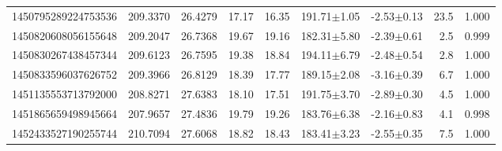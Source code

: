 \begin{table}[ht]
\begin{tabular}{rrrrrrrrc}
1450795289224753536 & 209.3370 & 26.4279 & 17.17 & 16.35 & 191.71$\pm$1.05 & -2.53$\pm$0.13 & 23.5 & 1.000 \\
1450820608056155648 & 209.2047 & 26.7368 & 19.67 & 19.16 & 182.31$\pm$5.80 & -2.39$\pm$0.61 & 2.5 & 0.999 \\
1450830267438457344 & 209.6123 & 26.7595 & 19.38 & 18.84 & 194.11$\pm$6.79 & -2.48$\pm$0.54 & 2.8 & 1.000 \\
1450833596037626752 & 209.3966 & 26.8129 & 18.39 & 17.77 & 189.15$\pm$2.08 & -3.16$\pm$0.39 & 6.7 & 1.000 \\
1451135553713792000 & 208.8271 & 27.6383 & 18.10 & 17.51 & 191.75$\pm$3.70 & -2.89$\pm$0.30 & 4.5 & 1.000 \\
1451865659498945664 & 207.9657 & 27.4836 & 19.79 & 19.26 & 183.76$\pm$6.38 & -2.16$\pm$0.83 & 4.1 & 0.998 \\
1452433527190255744 & 210.7094 & 27.6068 & 18.82 & 18.43 & 183.41$\pm$3.23 & -2.55$\pm$0.35 & 7.5 & 1.000 \\
\hline
\end{tabular}

\vspace{1ex}
\end{table}
